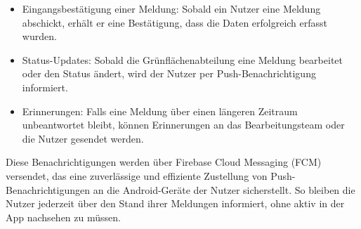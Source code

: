 \begin{itemize}
    \item Eingangsbestätigung einer Meldung: Sobald ein Nutzer eine Meldung abschickt, erhält er eine Bestätigung, dass die Daten erfolgreich erfasst wurden.
    \item Status-Updates: Sobald die Grünflächenabteilung eine Meldung bearbeitet oder den Status ändert, wird der Nutzer per Push-Benachrichtigung informiert.
    \item Erinnerungen: Falls eine Meldung über einen längeren Zeitraum unbeantwortet bleibt, können Erinnerungen an das Bearbeitungsteam oder die Nutzer gesendet werden.
\end{itemize}

Diese Benachrichtigungen werden über Firebase Cloud Messaging (FCM) versendet, das eine zuverlässige und effiziente Zustellung von Push-Benachrichtigungen an die Android-Geräte der Nutzer sicherstellt. So bleiben die Nutzer jederzeit über den Stand ihrer Meldungen informiert, ohne aktiv in der App nachsehen zu müssen.